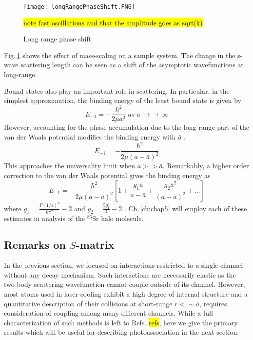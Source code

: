 \begin{figure} \label{fig:longRange}
	\centerline{
	\texttt{[image: longRangePhaseShift.PNG]}}
	\caption{Long range phase shift}{ \hl{note fast oscillations and that the amplitude goes as sqrt(k)}}
\end{figure} 
Fig.\,\ref{fig:longRange} shows the effect of mass-scaling on a sample system.
The change in the s-wave scattering length can be seen as a shift of the asymptotic wavefunctions at long-range.


Bound states also play an important role in scattering.
In particular, in the simplest approximation, the binding energy of the least bound state is given by
\begin{equation}
	E_{-1} = -\frac{\hbar^2}{2 \mu a^2} \; as \; a\,\rightarrow\,+\infty
\end{equation}
However, accounting for the phase accumulation due to the long-range part of the van der Waals potential modifies the binding energy with $\bar{a}$ \cite{gfl93}.
\begin{equation}
	E_{-1} = -\frac{\hbar^2}{2\mu(a-\bar{a})^2}
\end{equation}
This approaches the universality limit when $a >> \bar{a}$.
Remarkably, a higher order correction to the van der Waals potential gives the binding energy as 
\begin{equation}
	E_{-1} = -\frac{\hbar^2}{2\mu(a-\bar{a})^2}\left[1 + \frac{g_1 \bar{a}}{a-\bar{a}} + \frac{g_2 \bar{a}^2}{(a-\bar{a})^2}+\dots \right]
\end{equation}
where $g_1=\frac{\Gamma(1/4)^4}{6 \pi^2} - 2$ and $g_2 = \frac{5 g_1^2}{4} - 2$ \cite{gao04}.
Ch.\,\ref{ch:chap5} will employ each of these estimates in analysis of the $^{86}$Sr halo molecule.

\subsection{Remarks on $S$-matrix}
In the previous section, we focused on interactions restricted to a single channel without any decay mechanism.
Such interactions are necessarily elastic as the two-body scattering wavefunction cannot couple outside of its channel.
However, most atoms used in laser-cooling exhibit a high degree of internal structure and a quantitative description of their collisions at short-range $r <\sim \bar{a} $, requires consideration of coupling among many different channels.
While a full characterization of such methods is left to Refs.\cite{Hutson2007a} \hl{refs}, here we give the primary results which will be useful for describing photoassociation in the next section.

